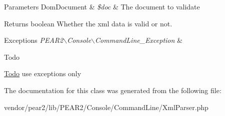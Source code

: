 \begin{DoxyParams}[1]{\-Parameters}
\-Dom\-Document & {\em \$doc} & \-The document to validate\\
\hline
\end{DoxyParams}
\begin{DoxyReturn}{\-Returns}
boolean \-Whether the xml data is valid or not. 
\end{DoxyReturn}

\begin{DoxyExceptions}{\-Exceptions}
{\em \-P\-E\-A\-R2$\backslash$\-Console$\backslash$\-Command\-Line\-\_\-\-Exception} & \\
\hline
\end{DoxyExceptions}
\begin{DoxyRefDesc}{\-Todo}
\item[\hyperlink{todo__todo000007}{\-Todo}]use exceptions only \end{DoxyRefDesc}


\-The documentation for this class was generated from the following file\-:\begin{DoxyCompactItemize}
\item 
vendor/pear2/lib/\-P\-E\-A\-R2/\-Console/\-Command\-Line/\-Xml\-Parser.\-php\end{DoxyCompactItemize}
